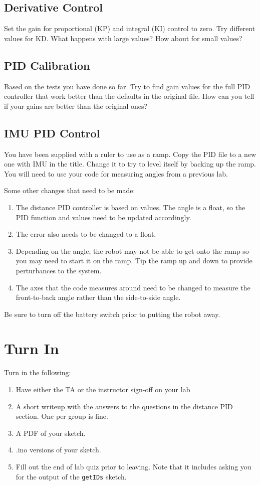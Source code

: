 \subsection{Derivative Control}
Set the gain for proportional (KP) and integral (KI) control to zero.
Try different values for KD. What happens with large values? How about 
for small values?

\subsection{PID Calibration}
Based on the tests you have done so far. Try to find gain values for the 
full PID controller that work better than the defaults in the original file.
How can you tell if your gains are better than the original ones?

\subsection{IMU PID Control}
You have been supplied with a ruler to use as a ramp. Copy the PID file to 
a new one with IMU in the title. Change it to try to level itself by 
backing up the ramp. You will need to use your code for measuring angles 
from a previous lab.

Some other changes that need to be made:
\begin{enumerate}
    \item The distance PID controller is based on \lstinline@int@ values.
            The angle is a float, so the PID function and values need to be 
            updated accordingly.
    \item The error also needs to be changed to a float.
    \item Depending on the angle, the robot may not be able to get onto the
            ramp so you may need to start it on the ramp. Tip the ramp up
            and down to provide perturbances to the system.
    \item The axes that the code measures around need to be changed to 
            measure the front-to-back angle rather than the side-to-side 
            angle.
\end{enumerate}

Be sure to turn off the battery switch prior to putting the robot away.

\section{Turn In}
Turn in the following:
\begin{enumerate}
    \item Have either the TA or the instructor sign-off on your lab
    \item A short writeup with the answers to the questions in the distance PID section. One per group is fine.
    \item A PDF of your sketch.
    \item .ino versions of your sketch.
    \item Fill out the end of lab quiz prior to leaving. Note that it includes asking you 
            for the output of the \lstinline$getIDs$ sketch. 
\end{enumerate}

